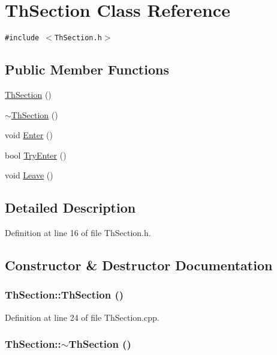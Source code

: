 \hypertarget{class_th_section}{
\section{ThSection Class Reference}
\label{class_th_section}
}
{\tt \#include $<$ThSection.h$>$}

\subsection*{Public Member Functions}
\begin{CompactItemize}
\item 
\hyperlink{class_th_section_cdee582bad9b56d44a7520ce8668b096}{ThSection} ()
\item 
\hyperlink{class_th_section_e1f8b49d0dad7b00bc6464497ba4ce3a}{$\sim$ThSection} ()
\item 
void \hyperlink{class_th_section_308968cbf58f2c8f4738237b5d5ea180}{Enter} ()
\item 
bool \hyperlink{class_th_section_a4d6e04ff8a6ded53a0261d3702b99b1}{TryEnter} ()
\item 
void \hyperlink{class_th_section_53584ae6470fbb5eac445d53e7f3da51}{Leave} ()
\end{CompactItemize}


\subsection{Detailed Description}


Definition at line 16 of file ThSection.h.

\subsection{Constructor \& Destructor Documentation}
\hypertarget{class_th_section_cdee582bad9b56d44a7520ce8668b096}{
\subsubsection[{ThSection}]{\setlength{\rightskip}{0pt plus 5cm}ThSection::ThSection ()}}
\label{class_th_section_cdee582bad9b56d44a7520ce8668b096}




Definition at line 24 of file ThSection.cpp.\hypertarget{class_th_section_e1f8b49d0dad7b00bc6464497ba4ce3a}{
\subsubsection[{$\sim$ThSection}]{\setlength{\rightskip}{0pt plus 5cm}ThSection::$\sim$ThSection ()}}
\label{class_th_section_e1f8b49d0dad7b00bc6464497ba4ce3a}





